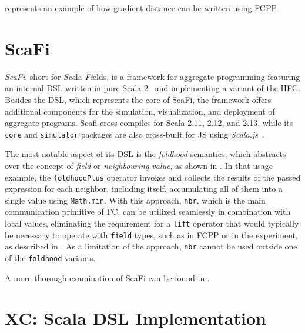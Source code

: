  represents an example of how gradient distance can be written using FCPP.




\section{ScaFi} \label{chap:state-of-the-art->sec:scafi}

\textit{ScaFi}, short for \textit{Sca}la \textit{Fi}elds, is a framework for aggregate programming featuring an internal \ac{DSL} written in pure Scala 2~\cite{scafi} and implementing a variant of the \ac{HFC}.
%
Besides the \ac{DSL}, which represents the core of ScaFi, the framework offers additional components for the simulation, visualization, and deployment of aggregate programs.
%
Scafi cross-compiles for Scala 2.11, 2.12, and 2.13, while its \texttt{core} and \texttt{simulator} packages are also cross-built for \ac{JS} using \textit{Scala.js}~\cite{scala-js}.

The most notable aspect of its \ac{DSL} is the \textit{foldhood} semantics, which abstracts over the concept of \textit{field} or \textit{neighbouring value}, as shown in .
%
In that usage example, the \texttt{foldhoodPlus} operator invokes and collects the results of the passed expression for each neighbor, including itself, accumulating all of them into a single value using \texttt{Math.min}.
%
With this approach, \texttt{nbr}, which is the main communication primitive of \ac{FC}, can be utilized seamlessly in combination with local values, eliminating the requirement for a \texttt{lift} operator that would typically be necessary to operate with \texttt{field} types, such as in FCPP or in the  experiment, as described in .
%
As a limitation of the approach, \texttt{nbr} cannot be used outside one of the \texttt{foldhood} variants.



A more thorough examination of ScaFi can be found in .

\section{XC: Scala DSL Implementation} \label{chap:state-of-the-art->sec:xc-experiment}

